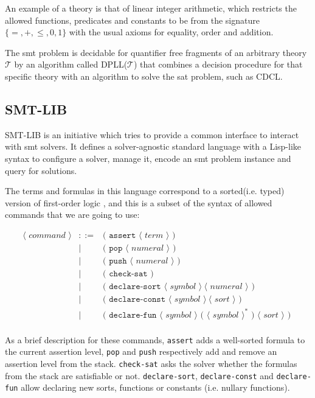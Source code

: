 An example of a theory is that of linear integer arithmetic, which restricts the
allowed functions, predicates and constants to be from the signature $\{=, +,
\leq, 0, 1\}$ with the usual axioms for equality, order and addition.

The \gls{smt} problem is decidable for quantifier free fragments of an arbitrary
theory $\mathcal{T}$ by an algorithm called DPLL($\mathcal{T}$) that combines a
decision procedure for that specific theory with an algorithm to solve the
\gls{sat} problem, such as CDCL. 

\subsection{SMT-LIB}
\label{prelim:smtlib}

SMT-LIB is an initiative which tries to provide a common interface to interact
with \acrshort{smt} solvers. It defines a solver-agnostic standard language with
a Lisp-like syntax to configure a solver, manage it, encode an \gls{smt} problem
instance and query for solutions.

The terms and formulas in this language correspond to a sorted(i.e. typed) 
version of first-order logic \citep{smtLibStandard}, and this is a subset 
of the syntax of allowed commands that we are going to use:

\[
\begin{array}{rcll}
\langle\textit{ command }\rangle & ::= & \texttt{( assert } \langle\textit{ term }\rangle\texttt{ ) }\\
& | & \texttt{( pop } \langle\textit{ numeral }\rangle \texttt{ ) }\\
& | & \texttt{( push } \langle\textit{ numeral }\rangle \texttt{ ) }\\
& | & \texttt{( check-sat )}\\
& | & \texttt{( declare-sort } \langle\textit{ symbol }\rangle~\langle\textit{ numeral }\rangle\texttt{ ) }\\
& | & \texttt{( declare-const } \langle\textit{ symbol }\rangle~\langle\textit{ sort }\rangle\texttt{ ) }\\
& | & \texttt{( declare-fun } \langle\textit{ symbol }\rangle \texttt{ ( }\langle\textit{ symbol }\rangle^* \texttt{ ) }\langle\textit{ sort }\rangle\texttt{ ) }\\
\end{array}
\]

As a brief description for these commands, \verb|assert| adds a well-sorted
formula to the current assertion level, \verb|pop| and \verb|push| respectively
add and remove an assertion level from the stack. \verb|check-sat| asks the
solver whether the formulas from the stack are satisfiable or not.
\verb|declare-sort|, \verb|declare-const| and \verb|declare-fun| allow declaring
new sorts, functions or constants (i.e.  nullary functions).

